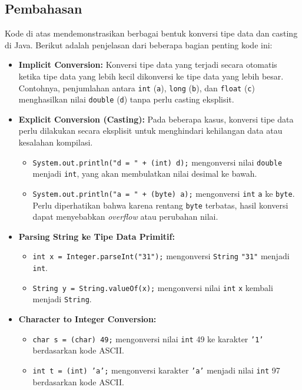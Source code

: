 \subsection{Pembahasan}
Kode di atas mendemonstrasikan berbagai bentuk konversi tipe data dan casting di Java. Berikut adalah penjelasan dari beberapa bagian penting kode ini:

\begin{itemize}
	\item \textbf{Implicit Conversion:} Konversi tipe data yang terjadi secara otomatis ketika tipe data yang lebih kecil dikonversi ke tipe data yang lebih besar. Contohnya, penjumlahan antara \texttt{int} (\texttt{a}), \texttt{long} (\texttt{b}), dan \texttt{float} (\texttt{c}) menghasilkan nilai \texttt{double} (\texttt{d}) tanpa perlu casting eksplisit.
	
	\item \textbf{Explicit Conversion (Casting):} Pada beberapa kasus, konversi tipe data perlu dilakukan secara eksplisit untuk menghindari kehilangan data atau kesalahan kompilasi.
	\begin{itemize}
		\item \texttt{System.out.println("d = " + (int) d);} mengonversi nilai \texttt{double} menjadi \texttt{int}, yang akan membulatkan nilai desimal ke bawah.
		\item \texttt{System.out.println("a = " + (byte) a);} mengonversi \texttt{int} \texttt{a} ke \texttt{byte}. Perlu diperhatikan bahwa karena rentang \texttt{byte} terbatas, hasil konversi dapat menyebabkan \textit{overflow} atau perubahan nilai.
	\end{itemize}
	
	\item \textbf{Parsing String ke Tipe Data Primitif:} 
	\begin{itemize}
		\item \texttt{int x = Integer.parseInt("31");} mengonversi \texttt{String} \texttt{"31"} menjadi \texttt{int}.
		\item \texttt{String y = String.valueOf(x);} mengonversi nilai \texttt{int} \texttt{x} kembali menjadi \texttt{String}.
	\end{itemize}
	
	\item \textbf{Character to Integer Conversion:} 
	\begin{itemize}
		\item \texttt{char s = (char) 49;} mengonversi nilai \texttt{int} 49 ke karakter \texttt{'1'} berdasarkan kode ASCII.
		\item \texttt{int t = (int) 'a';} mengonversi karakter \texttt{'a'} menjadi nilai \texttt{int} 97 berdasarkan kode ASCII.
	\end{itemize}
\end{itemize}

